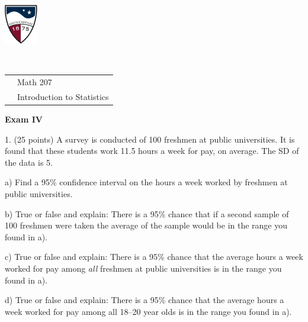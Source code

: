 \documentclass[10pt]{article}
\begin{document}
\pagestyle{empty}
\lstset{language=R, showspaces=false, showstringspaces=false}

\href{http://www.su.edu}{\includegraphics[height=1.75cm]{sulogo.eps}}
\vspace{-1.69cm}

{{\ }\hfill\small
\begin{tabular}{cl}
& Math 207\\
& Introduction to Statistics\\
\end{tabular}
}
\setlength{\baselineskip}{1.05\baselineskip}

\begin{center}
\textbf{\large  Exam IV}
\end{center}
\medskip

1. (25 points) A survey is conducted of 100 freshmen at public universities.
It is found that these students work 11.5 hours a week for pay, 
on average.  The SD of the data is 5.  

\hspace{20pt} a) Find a 95\% confidence interval
on the  hours  a week worked by freshmen at public universities.
\vspace{2.5in}

\hspace{20pt} b) True or false and explain:  There is a 95\% chance that
if a second sample of 100 freshmen were taken
the average of the sample would be in the range you found in a).
\vspace{1.5in}

\hspace{20pt} c) True or false and explain:  There is a 95\% chance that the
average hours a week worked for pay among \textit{all} freshmen at public universities
is in the range you found in a).
\vspace{1.5in}

\hspace{20pt} d) True or false and explain:  There is a 95\% chance that the
average hours a week worked for pay among all 18--20 year olds
is in the range you found in a).
\vspace{1in}
\vfill
\eject
{\ }
\end{document}
